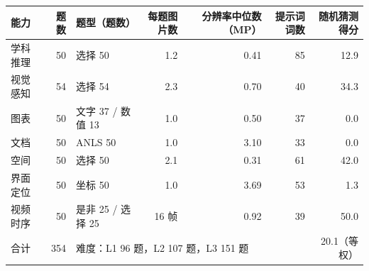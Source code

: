 \begin{tabular}{lrlrrrr}
\toprule
能力 & 题数 & 题型（题数） & 每题图片数 & 分辨率中位数（MP） & 提示词词数 & 随机猜测得分 \\
\midrule
学科推理 & 50 & 选择 50 & 1.2 & 0.41 & 85 & 12.9 \\
视觉感知 & 54 & 选择 54 & 2.3 & 0.70 & 40 & 34.3 \\
图表 & 50 & 文字 37 / 数值 13 & 1.0 & 0.50 & 37 & 0.0 \\
文档 & 50 & ANLS 50 & 1.0 & 3.10 & 33 & 0.0 \\
空间 & 50 & 选择 50 & 2.1 & 0.31 & 61 & 42.0 \\
界面定位 & 50 & 坐标 50 & 1.0 & 3.69 & 53 & 1.3 \\
视频时序 & 50 & 是非 25 / 选择 25 & 16 帧 & 0.92 & 39 & 50.0 \\
\midrule
合计 & 354 & \multicolumn{4}{l}{难度：L1 96 题，L2 107 题，L3 151 题} & 20.1（等权） \\
\bottomrule
\end{tabular}
